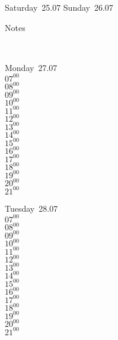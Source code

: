 \documentclass[11pt,a4paper]{book}\usepackage[]{graphicx}\usepackage[]{color}
\begin{document}
{{{{\begin{tcolorbox}
\end{tcolorbox} 
\begin{tcolorbox}[height=(\textheight-10mm)/6]
Saturday~25.07
\tcblower
Sunday~26.07
\end{tcolorbox} %
\begin{tcolorbox}[height=(\textheight-10mm)/6,sidebyside=false]
Notes
\end{tcolorbox}
\clearpage
\vspace{2 mm}\\
\begin{tcolorbox}
Monday~27.07\\
{ 
  $07^{00}$\\
$08^{00}$\\
$09^{00}$\\
$10^{00}$\\
$11^{00}$\\
$12^{00}$\\
$13^{00}$\\
$14^{00}$\\
$15^{00}$\\
$16^{00}$\\
$17^{00}$\\
$18^{00}$\\
$19^{00}$\\
$20^{00}$\\
$21^{00}$}\\

\end{tcolorbox}
\begin{tcolorbox}
Tuesday~28.07\\
{ 
  $07^{00}$\\
$08^{00}$\\
$09^{00}$\\
$10^{00}$\\
$11^{00}$\\
$12^{00}$\\
$13^{00}$\\
$14^{00}$\\
$15^{00}$\\
$16^{00}$\\
$17^{00}$\\
$18^{00}$\\
$19^{00}$\\
$20^{00}$\\
$21^{00}$}\\


\end{tcolorbox}}}}}
\end{document}
